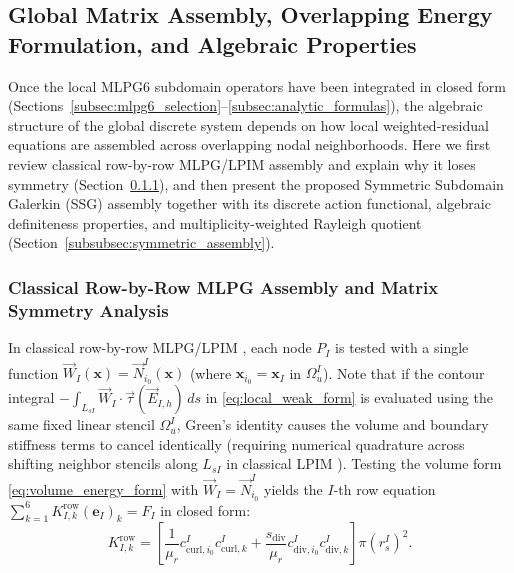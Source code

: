 \documentclass[VANCOUVER]{USG}
\begin{document}
\subsection{Global Matrix Assembly, Overlapping Energy Formulation, and Algebraic Properties}
\label{subsec:global_assembly_stability}

Once the local MLPG6 subdomain operators have been integrated in closed form (Sections~\ref{subsec:mlpg6_selection}--\ref{subsec:analytic_formulas}), the algebraic structure of the global discrete system depends on how local weighted-residual equations are assembled across overlapping nodal neighborhoods. Here we first review classical row-by-row MLPG/LPIM assembly and explain why it loses symmetry (Section~\ref{subsubsec:row_mlpg_symmetry}), and then present the proposed Symmetric Subdomain Galerkin (SSG) assembly together with its discrete action functional, algebraic definiteness properties, and multiplicity-weighted Rayleigh quotient (Section~\ref{subsubsec:symmetric_assembly}).

\subsubsection{Classical Row-by-Row MLPG Assembly and Matrix Symmetry Analysis}
\label{subsubsec:row_mlpg_symmetry}

In classical row-by-row MLPG/LPIM \cite{atluri1998new, atluri2002meshless, liu2001local}, each node $P_I$ is tested with a single function $\vec{W}_I(\mathbf{x}) = \vec{N}_{i_0}^I(\mathbf{x})$ (where $\mathbf{x}_{i_0} = \mathbf{x}_I$ in $\Omega_u^I$). Note that if the contour integral $-\int_{L_{sI}} \vec{W}_I \cdot \vec{\tau}(\vec{E}_{I,h})\,ds$ in \eqref{eq:local_weak_form} is evaluated using the same fixed linear stencil $\Omega_u^I$, Green's identity causes the volume and boundary stiffness terms to cancel identically (requiring numerical quadrature across shifting neighbor stencils along $L_{sI}$ in classical LPIM \cite{liu2001local}). Testing the volume form \eqref{eq:volume_energy_form} with $\vec{W}_I = \vec{N}_{i_0}^I$ yields the $I$-th row equation $\sum_{k=1}^6 K_{I, k}^{\mathrm{row}} (\mathbf{e}_I)_k = F_I$ in closed form:
\begin{equation}
    K_{I, k}^{\mathrm{row}} = \left[ \frac{1}{\mu_r} c_{\mathrm{curl}, i_0}^I c_{\mathrm{curl}, k}^I + \frac{s_{\mathrm{div}}}{\mu_r} c_{\mathrm{div}, i_0}^I c_{\mathrm{div}, k}^I \right] \pi (r_s^I)^2.
    \label{eq:k_row_analytic}
\end{equation}
\end{document}
